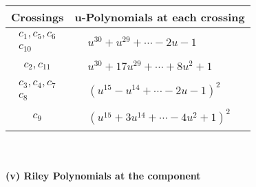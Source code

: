 \documentclass[1p]{elsarticle_modified}
\theoremstyle{definition}
\begin{document}
\begin{tabular}{m{50pt}|m{274pt}}
Crossings & \hspace{64pt}u-Polynomials at each crossing \\
\hline $$\begin{aligned}c_{1},c_{5},c_{6}\\c_{10}\end{aligned}$$&$\begin{aligned}
&u^{30}+u^{29}+\cdots-2 u-1
\end{aligned}$\\
\hline $$\begin{aligned}c_{2},c_{11}\end{aligned}$$&$\begin{aligned}
&u^{30}+17 u^{29}+\cdots+8 u^2+1
\end{aligned}$\\
\hline $$\begin{aligned}c_{3},c_{4},c_{7}\\c_{8}\end{aligned}$$&$\begin{aligned}
&(u^{15}- u^{14}+\cdots-2 u-1)^{2}
\end{aligned}$\\
\hline $$\begin{aligned}c_{9}\end{aligned}$$&$\begin{aligned}
&(u^{15}+3 u^{14}+\cdots-4 u^2+1)^{2}
\end{aligned}$\\
\hline
\end{tabular}\\~\\
\newpage\renewcommand{\arraystretch}{1}
\flushleft \textbf{(v) Riley Polynomials at the component}\newline \\
\end{document}
